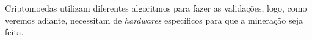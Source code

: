 \documentclass[
	article,			%
	12pt,				%
	openright,			%
	oneside,			%
	a4paper,			%
	chapter=TITLE,		%
	section=TITLE,		%
	subsection=TITLE,	%
	subsubsection=TITLE,%
	subsubsubsection=TITLE, %
	english,			%
	brazil,				%
	]{abntex2}
\begin{document}
Criptomoedas utilizam diferentes algoritmos para fazer as validações,
logo, como veremos adiante, necessitam de \emph{hardwares} específicos
para que a mineração seja feita.


\end{document}
